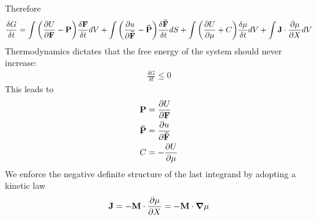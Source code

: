 \documentclass[12pt,3p]{article}
\numberwithin{equation}{section}
\begin{document}
Therefore 
\begin{align*}
\frac{\delta G}{\delta t} = \int \bigg( \pdv{U}{\mathbf{F}} - \mathbf{P} \bigg) \frac{\delta \mathbf{F}}{\delta t} dV + \int \bigg( \pdv{u}{\mathbf{\bar{F}}} - \mathbf{\bar{P}} \bigg)  \frac{\delta \mathbf{\bar{F}}}{\delta t} dS + \int \bigg( \pdv{U}{\mu} + C \bigg) \frac{\delta \mu}{\delta t} dV + \int \mathbf{J} \cdot \pdv{\mu}{X} dV
\end{align*}
Thermodynamics dictates that the free energy of the system should never increase: 
\begin{align}\label{2ndLawThermo}
\frac{\delta G}{\delta t} \leq 0 
\end{align}
This leads to
\begin{align*}
\mathbf{P} &= \pdv{U}{\mathbf{F}} \\
\mathbf{\bar{P}} &= \pdv{u}{\mathbf{\bar{F}}} \\
C &= -\pdv{U}{\mu}
\end{align*}
We enforce the negative definite structure of the last integrand by adopting a kinetic law
\begin{equation}\label{kinLaw}
\mathbf{J} = - \mathbf{M} \cdot \pdv{\mu}{X} = - \mathbf{M} \cdot \grad \mu
\end{equation}

\end{document}
